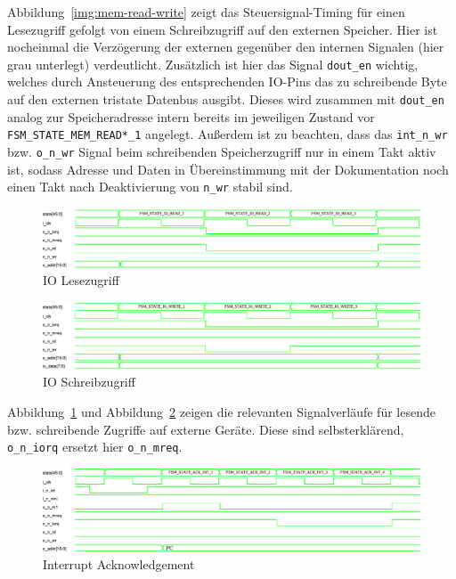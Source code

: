 \documentclass[ngerman, cd=lightcolor]{tudscrreprt}
\begin{document}
\noindent
Abbildung~\ref{img:mem-read-write} zeigt das Steuersignal-Timing für einen
Lesezugriff gefolgt von einem Schreibzugriff auf den externen Speicher. Hier
ist nocheinmal die Verzögerung der externen gegenüber den internen Signalen
(hier grau unterlegt) verdeutlicht. Zusätzlich ist hier das Signal
\texttt{dout\_en} wichtig, welches durch Ansteuerung des entsprechenden IO-Pins
das zu schreibende Byte auf den externen tristate Datenbus ausgibt. Dieses wird
zusammen mit \texttt{dout\_en} analog zur Speicheradresse intern bereits im
jeweiligen Zustand vor \texttt{FSM\_STATE\_MEM\_READ*\_1} angelegt. Außerdem
ist zu beachten, dass das \texttt{int\_n\_wr} bzw. \texttt{o\_n\_wr} Signal
beim schreibenden Speicherzugriff nur in einem Takt aktiv ist, sodass Adresse
und Daten in Übereinstimmung mit der Dokumentation noch einen Takt nach
Deaktivierung von \texttt{n\_wr} stabil sind.

\begin{figure}[htbp]
  \centering
    \includegraphics[width=\textwidth]{resources/pdf/io-read.pdf}
  \caption{IO Lesezugriff}
  \label{img:io-read}
\end{figure}

\begin{figure}[htbp]
  \centering
    \includegraphics[width=\textwidth]{resources/pdf/io-write.pdf}
  \caption{IO Schreibzugriff}
  \label{img:io-write}
\end{figure}

\noindent
Abbildung~\ref{img:io-read} und Abbildung~\ref{img:io-write} zeigen die
relevanten Signalverläufe für lesende bzw. schreibende Zugriffe auf externe
Geräte. Diese sind selbsterklärend, \texttt{o\_n\_iorq} ersetzt hier
\texttt{o\_n\_mreq}.

\pagebreak

\begin{figure}[htbp]
  \centering
    \includegraphics[width=\textwidth]{resources/pdf/ack-int.pdf}
  \caption{Interrupt Acknowledgement}
  \label{img:ack-int}
\end{figure}
\end{document}

